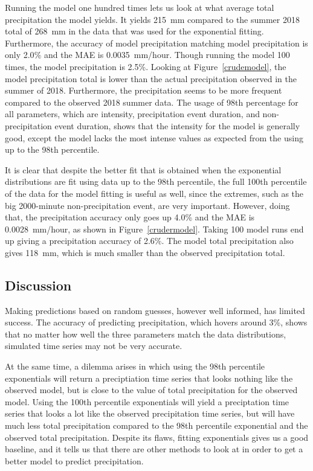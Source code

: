 \documentclass[11pt]{report}
\begin{document}
Running the model one hundred times lets us look at what average total
precipitation the model yields. It yields 215~mm compared to the summer 2018
total of 268~mm in the data that was used for the exponential
fitting. Furthermore, the accuracy of model precipitation matching model
precipitation is only 2.0$\%$ and the MAE is 0.0035~mm/hour. Though running the model 100 times, the model precipitation is 2.5\%. Looking at Figure~\ref{crudemodel}, the model precipitation total is lower than the actual precipitation observed in the summer of 2018. Furthermore, the precipitation seems to be more frequent compared to the observed 2018 summer data. The usage of 98th percentage for all parameters, which are intensity, precipitation event
duration, and non-precipitation event duration, shows that the intensity for
the model is generally good, except the model lacks the most intense values
as expected from the using up to the 98th percentile.

It is clear that despite the better fit that is obtained when the
exponential distributions are fit using data up to the 98th percentile,
the full 100th percentile of the data for the model fitting is useful as well,
since the extremes, such as the big 2000-minute non-precipitation event, are
very important. However, doing that, the precipitation accuracy only goes up 4.0\% and the MAE is 0.0028~mm/hour, as shown in Figure~\ref{crudermodel}. Taking 100 model runs end up giving a precipitation accuracy of 2.6\%. The model total precipitation also gives 118~mm, which is much smaller than the observed precipitation total. 


\subsection{Discussion}\label{sec:spc_d}

Making predictions based on random guesses, however well informed, has
limited success. The accuracy of predicting precipitation, which hovers
around 3\%, shows that no matter how well the three parameters match the
data distributions, simulated time series may not be very accurate.

At the same time, a dilemma arises in which using the 98th percentile
exponentials will return a preciptiation time series that looks nothing like
the observed model, but is close to the value of total precipitation for the
observed model. Using the 100th percentile exponentials will yield a
preciptation time series that looks a lot like the observed precipitation
time series, but will have much less total precipitation compared to the
98th percentile exponential and the observed total precipitation. Despite its flaws, fitting exponentials gives us a good baseline, and it
tells us that there are other methods to look at in order to get a better
model to predict precipitation.
\end{document}
